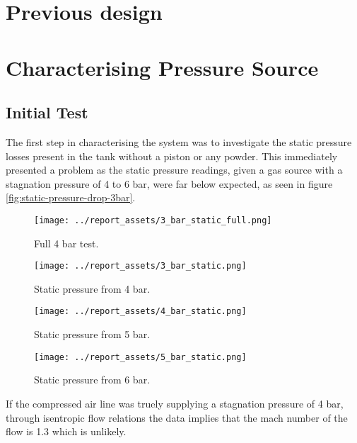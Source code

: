 \section{Previous design}
\section{Characterising Pressure Source}\label{sec:static_test}
\subsection{Initial Test}
The first step in characterising the system was to investigate the static pressure losses present in the tank without a piston or any powder. This immediately presented a problem as the static pressure readings, given a gas source with a stagnation pressure of 4 to 6 bar, were far below expected, as seen in figure \autoref{fig:static-pressure-drop-3bar}. 
\begin{figure}[htbp]
    \centering

    \begin{minipage}{0.45\textwidth}
        \centering
        \texttt{[image: ../report\_assets/3\_bar\_static\_full.png]}
        \caption{Full 4 bar test.}\label{fig:static-pressure-drop-3bar_full}
    \end{minipage}
    \hfill
    \begin{minipage}{0.45\textwidth}
        \centering
        \texttt{[image: ../report\_assets/3\_bar\_static.png]}
        \caption{Static pressure from 4 bar.}\label{fig:static-pressure-drop-3bar}
    \end{minipage}
    \begin{minipage}{0.45\textwidth}
        \centering
        \texttt{[image: ../report\_assets/4\_bar\_static.png]}
        \caption{Static pressure from 5 bar.}\label{fig:static-pressure-drop-4bar}
    \end{minipage}
    \hfill
    \begin{minipage}{0.45\textwidth}
        \centering
        \texttt{[image: ../report\_assets/5\_bar\_static.png]}
        \caption{Static pressure from 6 bar.}\label{fig:static-pressure-drop-5bar}
    \end{minipage}


\end{figure}
If the compressed air line was truely supplying a stagnation pressure of 4 bar, through isentropic flow relations the data implies that the mach number of the flow is 1.3 which is unlikely.

